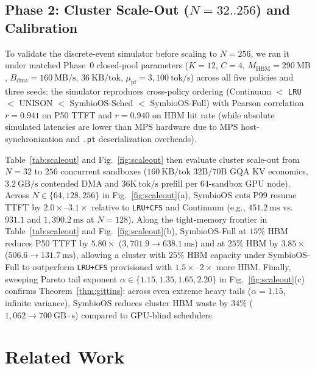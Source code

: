 \documentclass[10pt,journal,compsoc]{IEEEtran}
\theoremstyle{definition}
\theoremstyle{remark}
\newcommand{\SymbioOS}{\textup{\textsc{SymbioOS}}}
\newcommand{\SymbioSched}{\textup{\textsc{SymbioOS-Sched}}}
\newcommand{\SymbioFull}{\textup{\textsc{SymbioOS-Full}}}
\newcommand{\Continuum}{\textup{\textsc{Continuum}}}
\newcommand{\UNISON}{\textup{\textsc{UNISON}}}
\def\SymbioOS{SymbioOS}%
\def\SymbioSched{SymbioOS-Sched}%
\def\SymbioFull{SymbioOS-Full}%
\def\Continuum{Continuum}%
\def\UNISON{UNISON}%
\begin{document}
\subsection{Phase 2: Cluster Scale-Out ($N = 32..256$) and Calibration}
To validate the discrete-event simulator before scaling to $N = 256$, we ran it under matched Phase~0 closed-pool parameters ($K=12$, $C=4$, $M_{\mathrm{HBM}}=290~\mathrm{MB}$, $B_{\mathrm{dma}}=160~\mathrm{MB/s}$, $36~\mathrm{KB/tok}$, $\mu_{\mathrm{pf}} = 3{,}100~\mathrm{tok/s}$) across all five policies and three seeds: the simulator reproduces cross-policy ordering (\Continuum{} $<$ \texttt{LRU} $<$ \UNISON{} $<$ \SymbioSched{} $<$ \SymbioFull{}) with Pearson correlation $r = 0.941$ on P50 TTFT and $r = 0.940$ on HBM hit rate (while absolute simulated latencies are lower than MPS hardware due to MPS host-synchronization and \texttt{.pt} deserialization overheads).

Table~\ref{tab:scaleout} and Fig.~\ref{fig:scaleout} then evaluate cluster scale-out from $N = 32$ to $256$ concurrent sandboxes ($160~\mathrm{KB/tok}$ $32\mathrm{B}/70\mathrm{B}$ GQA KV economics, $3.2~\mathrm{GB/s}$ contended DMA and $36\mathrm{K}~\mathrm{tok/s}$ prefill per $64$-sandbox GPU node). Across $N \in \{64, 128, 256\}$ in Fig.~\ref{fig:scaleout}(a), \SymbioOS{} cuts P99 resume TTFT by $2.0\times$--$3.1\times$ relative to \texttt{LRU+CFS} and \Continuum{} (e.g., $451.2~\mathrm{ms}$ vs.\ $931.1$ and $1{,}390.2~\mathrm{ms}$ at $N = 128$). Along the tight-memory frontier in Table~\ref{tab:scaleout} and Fig.~\ref{fig:scaleout}(b), \SymbioFull{} at $15\%$ HBM reduces P50 TTFT by $5.80\times$ ($3{,}701.9 \to 638.1~\mathrm{ms}$) and at $25\%$ HBM by $3.85\times$ ($506.6 \to 131.7~\mathrm{ms}$), allowing a cluster with $25\%$ HBM capacity under \SymbioFull{} to outperform \texttt{LRU+CFS} provisioned with $1.5\times$--$2\times$ more HBM. Finally, sweeping Pareto tail exponent $\alpha \in \{1.15, 1.35, 1.65, 2.20\}$ in Fig.~\ref{fig:scaleout}(c) confirms Theorem~\ref{thm:gittins}: across even extreme heavy tails ($\alpha = 1.15$, infinite variance), \SymbioOS{} reduces cluster HBM waste by $34\%$ ($1{,}062 \to 700~\mathrm{GB}\cdot\mathrm{s}$) compared to GPU-blind schedulers.

\section{Related Work}\label{sec:related}
\end{document}
